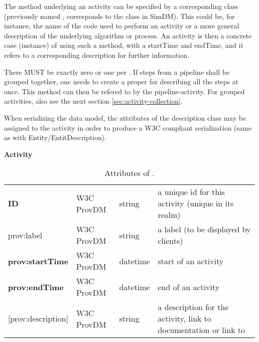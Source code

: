 The method underlying an activity can be specified by a corresponding 
 class (previously named , corresponds 
to the  class in SimDM). This could be, 
for instance, the name of the code used to perform an activity or a more general 
description of the underlying algorithm or process. An activity is then a 
concrete case (instance) of using such a method, with a startTime and endTime, 
and it refers to a corresponding description for further information.

There MUST be exactly zero or  one  per . If steps from a 
pipeline shall be grouped together, one needs to create a proper 
 for describing all the steps at once. This method can then 
be refered to by the pipeline-activity. For grouped activities, also see the 
next section \ref{sec:activity-collection}.

When serializing the data model, the attributes
of the description class may be assigned to the activity in order to produce 
a W3C compliant serialization (same as with Entity/EntitDescription).

\begin{table}[h]

\small
{}\textwidth

\textbf{\normalsize Activity}\vspace{0.25em}\\
\begin{tabulary}{1.0\textwidth}{@{}lp{2.5cm}lL@{}}
\toprule
{} &  &  & \\
\midrule
\textbf{ID} & W3C ProvDM  & string & a unique id for this activity (unique in its realm)\\
prov:label        & W3C ProvDM  & string & a label (to be displayed by clients)\\
\textbf{prov:startTime} & W3C ProvDM  & datetime & start of an activity\\
\textbf{prov:endTime} & W3C ProvDM  & datetime & end of an activity\\
{[prov:description]}  & W3C ProvDM & string & a description for the activity, 
				link to documentation or link to \\
\bottomrule
\end{tabulary}
\caption{Attributes of .}
\end{table}


